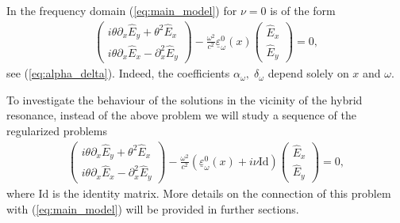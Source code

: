 {In the frequency domain (\ref{eq:main_model}) for $\nu=0$ is of the form 
\begin{align}
\label{eq:main_frequency_domain_intro}
\left(
\begin{matrix}
 i\theta \partial_x \hat{E}_y+\theta^2 \hat{E}_x\\
 i\theta \partial_x \hat{E}_x -\partial_x^2 \hat{E}_y
\end{matrix}
\right)-\frac{\omega^2}{c^2}
\underline{\varepsilon}_{\omega}^{0}(x)\left(
\begin{matrix}
 \hat{E}_x\\
 \hat{E}_y
\end{matrix}
\right)
=0,
\end{align}
see (\ref{eq:alpha_delta}). Indeed, the coefficients $\alpha_{\omega},\;\delta_{\omega}$ depend solely on $x$ and $\omega$.  

To investigate the behaviour of the solutions in the vicinity of the hybrid resonance, 
instead of the above problem we will study a sequence of the regularized problems 
\begin{align}
\label{eq:seq_regularized}
\left(
\begin{matrix}
 i\theta \partial_x \hat{E}_y+\theta^2 \hat{E}_x\\
 i\theta \partial_x \hat{E}_x -\partial_x^2 \hat{E}_y
\end{matrix}
\right)-\frac{\omega^2}{c^2}
\left(\underline{\varepsilon}_{\omega}^{0}(x)+i\nu \mathrm{Id}\right)\left(
\begin{matrix}
 \hat{E}_x\\
 \hat{E}_y
\end{matrix}
\right)
=0,
\end{align}
where $\mathrm{Id}$ is the identity matrix. More details on the connection of this problem with (\ref{eq:main_model}) will be provided in further sections. 

 



}
